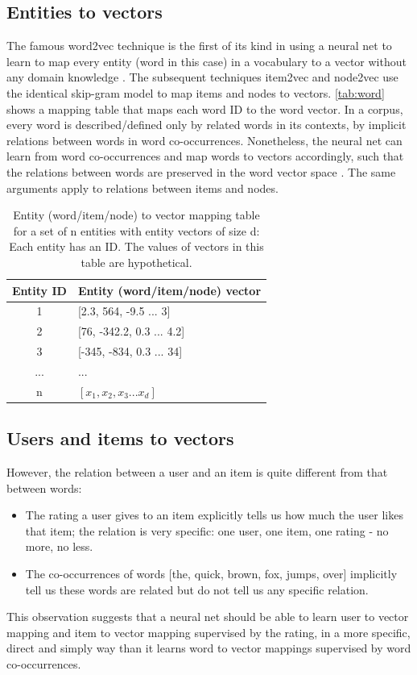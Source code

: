 \documentclass[twocolumn]{article}
\begin{document}
\subsection{Entities to vectors}
The famous word2vec technique is the first of its kind in using a neural net to 
learn to map every entity (word in this case) in a vocabulary to a vector 
without any domain knowledge \cite{mikolov2013efficient}.
The subsequent techniques item2vec and node2vec use the identical skip-gram 
model to map items and nodes to vectors.
\autoref{tab:word} shows a mapping table that maps each word ID to the word 
vector.
In a corpus, every word is described/defined only by related words in its 
contexts, by implicit relations between words in word co-occurrences.
Nonetheless, the neural net can learn from word co-occurrences and map words to 
vectors accordingly,
such that the relations between words are preserved in the word vector space 
\cite{mikolov2013distributed}.
The same arguments apply to relations between items and nodes.
\begin{table}[h]
	\centering
	\caption{Entity (word/item/node) to vector mapping table for a set of n
		entities with entity vectors of size d:
		Each entity has an ID.
		The values of vectors in this table are hypothetical.}
	\begin{tabularx}{0.5\textwidth}{|c|X|} \hline \rowcolor{blue!50}
		Entity ID & Entity (word/item/node) vector \\ \hline
		1 & [2.3, 564, -9.5 ... 3] \\ \hline
		2 & [76, -342.2, 0.3 ... 4.2] \\ \hline
		3 & [-345, -834, 0.3 ... 34] \\ \hline
		... & ... \\ \hline
		n & $ [x_1, x_2, x_3 ... x_d] $ \\ \hline
	\end{tabularx}
	\label{tab:word}
\end{table}

\subsection{Users and items to vectors}
However, the relation between a user and an item is quite different from that 
between words:
\begin{itemize}
	\item The rating a user gives to an item explicitly tells us how much the 
	user likes that item;
	the relation is very specific: one user, one item, one rating - no more, no 
	less.
	\item The co-occurrences of words [the, quick, brown, fox, jumps, over] 
	implicitly tell us these words are related but do not tell us any specific 
	relation.
\end{itemize}
This observation suggests that a neural net should be able to learn user to 
vector mapping and item to vector mapping supervised by the rating, in a more 
specific, direct and simply way than it learns word to vector mappings 
supervised by word co-occurrences.
\end{document}
